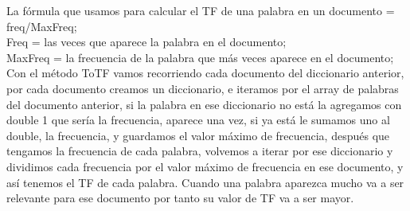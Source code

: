 \documentclass[12pt, a4paper]{article}
\begin{document}
\begin{enumerate}
          La fórmula que usamos para calcular el TF de una palabra
          en un documento = freq/MaxFreq;\\
          Freq = las veces que aparece la palabra en el documento;\\
          MaxFreq = la frecuencia de la palabra que más veces aparece en el documento;\\
          Con el método ToTF vamos recorriendo cada documento del diccionario anterior,
          por cada documento creamos un diccionario, e iteramos por el array de
          palabras del documento anterior, si la palabra en ese diccionario no
          está la agregamos con double 1 que sería la frecuencia, aparece una vez,
          si ya está le sumamos uno al double, la frecuencia,
          y guardamos el valor máximo de frecuencia, después que tengamos
          la frecuencia de cada palabra, volvemos a iterar por ese diccionario y
          dividimos cada frecuencia por el valor máximo de frecuencia en ese documento,
          y así tenemos el TF de cada palabra. Cuando una palabra aparezca mucho va a ser
          relevante para ese documento por tanto su valor de TF va a ser mayor.


\end{enumerate}
\end{document}
